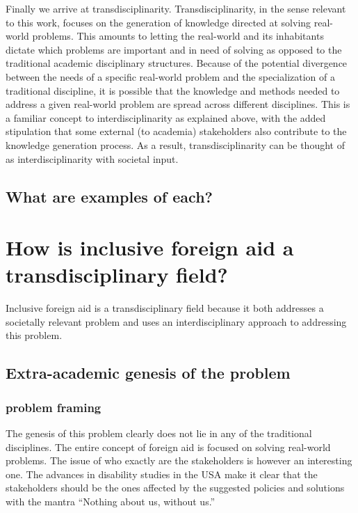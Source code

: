 \documentclass{lps}
\begin{document}
Finally we arrive at transdisciplinarity. Transdisciplinarity, in the sense
relevant to this work, focuses on the generation of knowledge directed at
solving real-world problems. This amounts to letting the real-world and its
inhabitants dictate which problems are important and in need of solving as
opposed to the traditional academic disciplinary structures. Because of the
potential divergence between the needs of a specific real-world problem and
the specialization of a traditional discipline, it is possible that the
knowledge and methods needed to address a given real-world problem are spread
across different disciplines. This is a familiar concept to
interdisciplinarity as explained above, with the added stipulation that some
external (to academia) stakeholders also contribute to the knowledge
generation process. As a result, transdisciplinarity can be thought of as
interdisciplinarity with societal input. 

\subsection{What are examples of each?}

\section{How is inclusive foreign aid a transdisciplinary field?}

Inclusive foreign aid is a transdisciplinary field because it both addresses a
societally relevant problem and uses an interdisciplinary approach to
addressing this problem. 

\subsection{Extra-academic genesis of the problem}

\subsubsection{problem framing}

The genesis of this problem clearly does not lie in any of the traditional
disciplines. The entire concept of foreign aid is focused on solving
real-world problems. The issue of who exactly are the stakeholders is however
an interesting one. The advances in disability studies in the USA make it
clear that the stakeholders should be the ones affected by the suggested
policies and solutions with the mantra ``Nothing about us, without us.''
\end{document}

